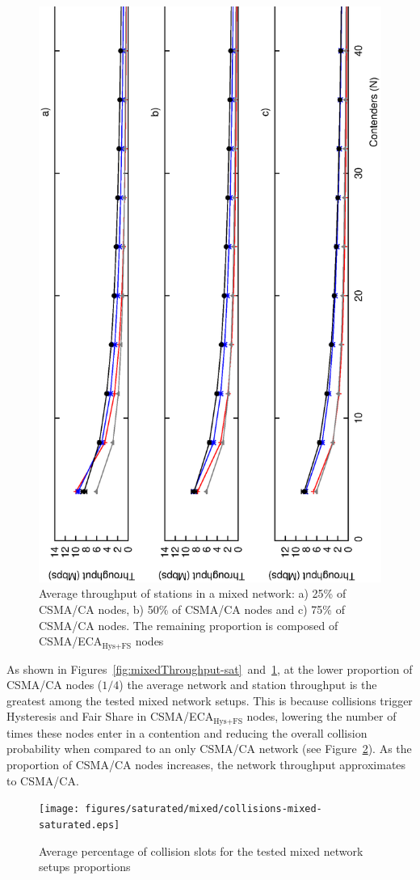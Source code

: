 \documentclass[a4paper,journal]{IEEEtran}
\begin{document}
	\begin{figure}[htbp]
		\centering
		\includegraphics[width=0.9\linewidth,angle=-90]{figures/saturated/mixed/throughput-saturated-mixed-stationGroups.eps}
		\caption{Average throughput of stations in a mixed network: a) 25\% of CSMA/CA nodes, b) 50\% of CSMA/CA nodes and c) 75\% of CSMA/CA nodes. The remaining proportion is composed of CSMA/ECA$_{\text{Hys+FS}}$ nodes}
		\label{fig:mixedThroughput-sat-stations}
	\end{figure}
	
	As shown in Figures~\ref{fig:mixedThroughput-sat}~and~\ref{fig:mixedThroughput-sat-stations}, at the lower proportion of CSMA/CA nodes ($1/4$) the average network and station throughput is the greatest among the tested mixed network setups. This is because collisions trigger Hysteresis and Fair Share in CSMA/ECA$_{\text{Hys+FS}}$ nodes, lowering the number of times these nodes enter in a contention and reducing the overall collision probability when compared to an only CSMA/CA network (see Figure~\ref{fig:mixedCollisions-sat}). As the proportion of CSMA/CA nodes increases, the network throughput approximates to CSMA/CA.	
	\begin{figure}[htbp]
		\centering
		\texttt{[image: figures/saturated/mixed/collisions-mixed-saturated.eps]}
		\caption{Average percentage of collision slots for the tested mixed network setups proportions}
		\label{fig:mixedCollisions-sat}
	\end{figure}
		
\end{document}
